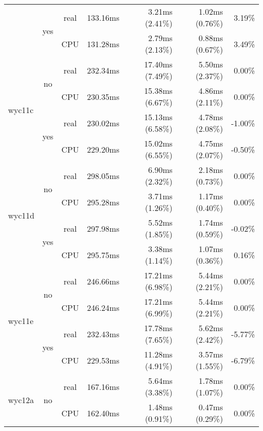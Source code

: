 \documentclass[en]{pracamgr}
\begin{document}
\begin{appendices}
\begin{small}
\begin{longtable}{|l|c|c|r|r|r|r|}
                          \cline{2-7}
                          & \multirow{2}{*}{yes} & real & 133.16ms & 3.21ms (2.41\%) & 1.02ms (0.76\%) & 3.19\% \\*
                          &                      & CPU  & 131.28ms & 2.79ms (2.13\%) & 0.88ms (0.67\%) & 3.49\% \\
\hline
\multirow{4}{*}{wyc11c}   & \multirow{2}{*}{no}  & real & 232.34ms & 17.40ms (7.49\%) & 5.50ms (2.37\%) & 0.00\% \\*
                          &                      & CPU  & 230.35ms & 15.38ms (6.67\%) & 4.86ms (2.11\%) & 0.00\% \\*
                          \cline{2-7}
                          & \multirow{2}{*}{yes} & real & 230.02ms & 15.13ms (6.58\%) & 4.78ms (2.08\%) & -1.00\% \\*
                          &                      & CPU  & 229.20ms & 15.02ms (6.55\%) & 4.75ms (2.07\%) & -0.50\% \\
\hline
\multirow{4}{*}{wyc11d}   & \multirow{2}{*}{no}  & real & 298.05ms & 6.90ms (2.32\%) & 2.18ms (0.73\%) & 0.00\% \\*
                          &                      & CPU  & 295.28ms & 3.71ms (1.26\%) & 1.17ms (0.40\%) & 0.00\% \\*
                          \cline{2-7}
                          & \multirow{2}{*}{yes} & real & 297.98ms & 5.52ms (1.85\%) & 1.74ms (0.59\%) & -0.02\% \\*
                          &                      & CPU  & 295.75ms & 3.38ms (1.14\%) & 1.07ms (0.36\%) & 0.16\% \\
\hline
\multirow{4}{*}{wyc11e}   & \multirow{2}{*}{no}  & real & 246.66ms & 17.21ms (6.98\%) & 5.44ms (2.21\%) & 0.00\% \\*
                          &                      & CPU  & 246.24ms & 17.21ms (6.99\%) & 5.44ms (2.21\%) & 0.00\% \\*
                          \cline{2-7}
                          & \multirow{2}{*}{yes} & real & 232.43ms & 17.78ms (7.65\%) & 5.62ms (2.42\%) & -5.77\% \\*
                          &                      & CPU  & 229.53ms & 11.28ms (4.91\%) & 3.57ms (1.55\%) & -6.79\% \\
\hline
\multirow{4}{*}{wyc12a}   & \multirow{2}{*}{no}  & real & 167.16ms & 5.64ms (3.38\%) & 1.78ms (1.07\%) & 0.00\% \\*
                          &                      & CPU  & 162.40ms & 1.48ms (0.91\%) & 0.47ms (0.29\%) & 0.00\% \\*

\end{longtable}
\end{small}
\end{appendices}
\end{document}
